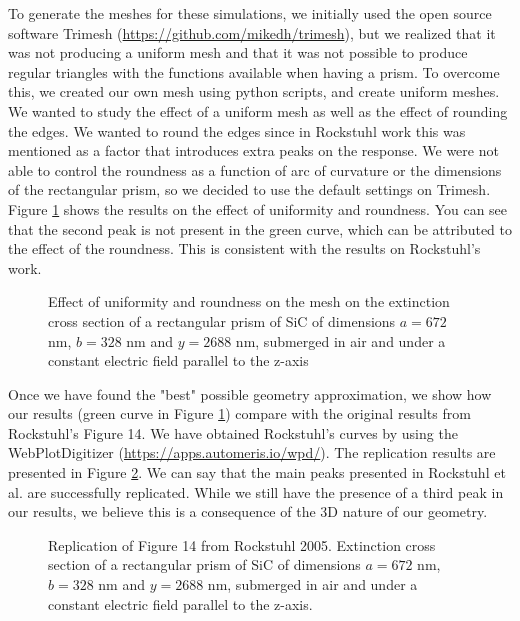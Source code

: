To generate the meshes for these simulations, we initially used the open source software Trimesh 
(\url{https://github.com/mikedh/trimesh}), but we realized that it was not producing a 
uniform mesh and that it was not possible to produce regular triangles with the functions 
available when having a prism. To overcome this, we created our own mesh using python scripts,
and create uniform meshes. We wanted to study the effect of a uniform mesh as well as the effect
of rounding the edges. We wanted to round the edges since in Rockstuhl work this was mentioned 
as a factor that introduces extra peaks on the response. We were not able to control the 
roundness as a function of arc of curvature or the dimensions of the rectangular prism, so we 
decided to use the default settings on Trimesh. Figure \ref{fig:tri_reg_round_14} shows the 
results on the effect of uniformity and roundness. You can see that the second peak is not
present in the green curve, which can be attributed to the effect of the roundness. This is 
consistent with the results on Rockstuhl's work. 

\begin{figure}
    \centering
    \caption{ Effect of uniformity and roundness on the mesh on the 
    extinction cross section of a rectangular prism of SiC of dimensions $a=672$ nm, 
    $b=328$ nm and $y=2688$ nm, submerged in air and under a constant electric field 
    parallel to the z-axis}
    \label{fig:tri_reg_round_14}
 \end{figure}

Once we have found the "best" possible geometry approximation, we show how our results 
(green curve in Figure \ref{fig:tri_reg_round_14}) compare 
with the original results from Rockstuhl's Figure 14. We have obtained Rockstuhl's curves by using 
the WebPlotDigitizer (\url{https://apps.automeris.io/wpd/}). The replication results are 
presented in Figure \ref{fig:rep_14}. We can say that the main peaks presented in Rockstuhl et al. are 
successfully replicated. While we still have the presence of a third peak in our results, we believe 
this is a consequence of the 3D nature of our geometry.

 \begin{figure}
    \centering
    \caption{Replication of Figure 14 from Rockstuhl 2005. Extinction cross section of a
    rectangular prism of SiC of dimensions $a=672$ nm, $b=328$ nm and $y=2688$ nm, submerged
    in air and under a constant electric field parallel to the z-axis.}
    \label{fig:rep_14}
 \end{figure}


